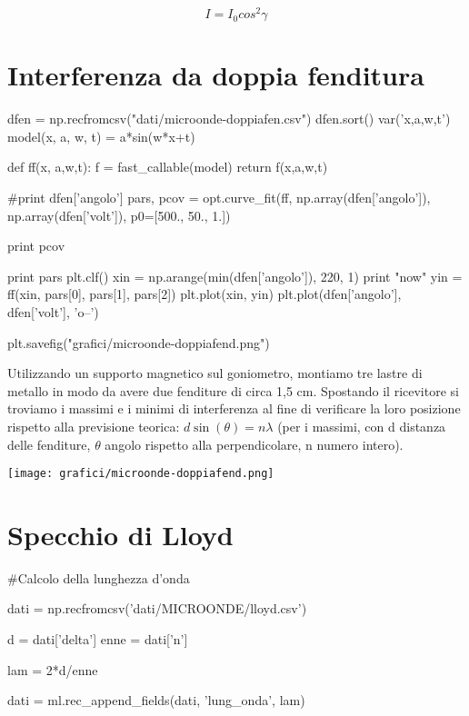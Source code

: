 \begin{equation}
I = I_{0} cos^2 \gamma
\end{equation}

\begin{center}
\end{center}


\section{Interferenza da doppia fenditura}
\begin{sagesilent}
dfen = np.recfromcsv("dati/microonde-doppiafen.csv")
dfen.sort()
var('x,a,w,t')
model(x, a, w, t) = a*sin(w*x+t)

def ff(x, a,w,t):
  f = fast_callable(model)
  return f(x,a,w,t)

#print dfen['angolo']
pars, pcov = opt.curve_fit(ff, np.array(dfen['angolo']), np.array(dfen['volt']), p0=[500., 50., 1.])

print pcov

print pars
plt.clf()
xin = np.arange(min(dfen['angolo']), 220, 1)
print "now"
yin = ff(xin, pars[0], pars[1], pars[2])
plt.plot(xin, yin)
plt.plot(dfen['angolo'], dfen['volt'], 'o--')

plt.savefig("grafici/microonde-doppiafend.png")
\end{sagesilent}


Utilizzando un supporto magnetico sul goniometro, montiamo tre lastre di metallo in modo da avere due
fenditure di circa 1,5 cm. Spostando il ricevitore si troviamo i massimi e i minimi di interferenza al fine di verificare la
loro posizione rispetto alla previsione teorica: $d \sin(\theta) = n \lambda$ (per i massimi, con d distanza delle fenditure, $\theta$ angolo
rispetto alla perpendicolare, n numero intero).

\texttt{[image: grafici/microonde-doppiafend.png]}

\section{Specchio di Lloyd}

\begin{sagesilent}
#Calcolo della lunghezza d'onda

dati = np.recfromcsv('dati/MICROONDE/lloyd.csv')

d = dati['delta']
enne = dati['n']

lam = 2*d/enne


dati = ml.rec_append_fields(dati, 'lung_onda', lam)

\end{sagesilent}

